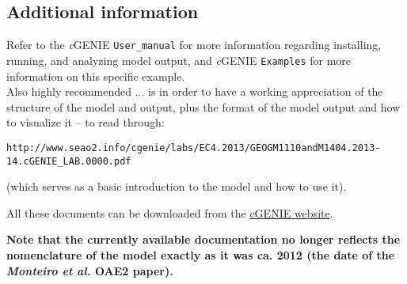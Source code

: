 \documentclass[10pt,twoside]{article}
\begin{document}
\subsection{Additional information}

Refer to the \textit{c}GENIE \texttt{User\_manual} for more information regarding installing, running, and analyzing model output, and \textit{c}GENIE \texttt{Examples} for more information on this specific example. 
\\Also highly recommended ... is in order to have a working appreciation of the structure of the model and output, plus the format of the model output and how to visualize it -- to read through:
\small\vspace{-5pt}\begin{verbatim}
http://www.seao2.info/cgenie/labs/EC4.2013/GEOGM1110andM1404.2013-14.cGENIE_LAB.0000.pdf
\end{verbatim}\vspace{-5pt}\normalsize
(which serves as a basic introduction to the model and how to use it).

\noindent All these documents can be downloaded from the \href{http://www.seao2.info/mycgenie.html}{cGENIE website}.

\noindent \textbf{Note that the currently available documentation no longer reflects the nomenclature of the model exactly as it was ca. 2012 (the date of the \textit{Monteiro et al.} OAE2 paper).}

\end{document}
